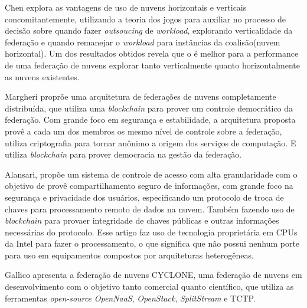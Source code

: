 Chen\cite{7835207} explora as vantagens de uso de nuvens horizontais e verticais concomitantemente, utilizando a teoria dos jogos para auxiliar no processo de decisão sobre quando fazer \textit{outsoucing} de \textit{workload}, explorando verticalidade da federação e quando remanejar o \textit{workload} para instâncias da coalisão(nuvem horizontal). Um dos resultados obtidos revela que o é melhor para a performance de uma federação de nuvens explorar tanto verticalmente quanto horizontalmente as nuvens existentes.

Margheri \cite{FaaS_8030651} proprõe uma arquitetura de federações de nuvens completamente distribuída, que utiliza uma \textit{blockchain} para prover um controle democrático da federação. Com grande foco em segurança e estabilidade, a arquitetura proposta provê a cada um dos membros os mesmo nível de controle sobre a federação, utiliza criptografia para tornar anônimo a origem dos serviços de computação. E utiliza \textit{blockchain} para prover democracia na gestão da federação.

Alansari\cite{ACS_Federation_7980160}, propõe um sistema de controle de acesso com alta granularidade com o objetivo de provê compartilhamento seguro de informações, com grande foco na segurança e privacidade dos usuários, especificando um protocolo de troca de chaves para processamento remoto de dados na nuvem. Também fazendo uso de \textit{blockchain} para provaer integridade de chaves públicas e outras informações necessárias do protocolo. Esse artigo faz uso de tecnologia proprietária em \acrshort{CPU}s da Intel para fazer o processamento, o que significa que não possui nenhum porte para uso em equipamentos compostos por arquiteturas heterogêneas.

Gallico\cite{CYCLONE_7776591} apresenta a federação de nuvens CYCLONE, uma federação de nuvens em desenvolvimento com o objetivo tanto comercial quanto científico, que utiliza as ferramentas \textit{open-source} \textit{OpenNaaS}, \textit{OpenStack}, \textit{SplitStream} e \acrfull{TCTP}.

